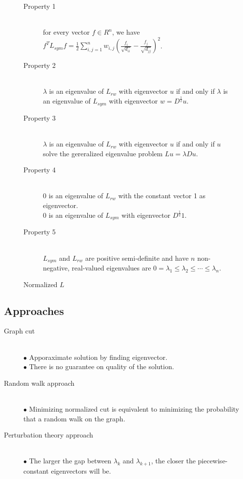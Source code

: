 \begin{figure}[ht]
\begin{mdframed}
\begin{description}
\item[Property 1] \hfill \\
for every vector $f \in R^n$, we have $f^T L_{sym} f = \frac{1}{2} \sum_{i,j=1}^{n} w_{i,j}(\frac{f_i}{\sqrt{d_{ii}}} - \frac{f_j}{\sqrt{d_{jj}}})^2$.
\item[Property 2] \hfill \\
$\lambda$ is an eigenvalue of $L_{rw}$ with eigenvector $u$ if and only if $\lambda$ is an eigenvalue of $L_{sym}$ with eigenvector $w = D^{\frac{1}{2}} u$.
\item[Property 3] \hfill \\
$\lambda$ is an eigenvalue of $L_{rw}$ with eigenvector $u$ if and only if $u$ solve the gereralized eigenvalue problem $L u = \lambda D u$.
\item[Property 4] \hfill \\
0 is an eigenvalue of $L_{rw}$ with the constant vector 1 as eigenvector.\\
0 is an eigenvalue of $L_{sym}$ with eigenvector $D^{\frac{1}{2}} 1 $.
\item[Property 5] \hfill \\
$L_{sym}$ and $L_{rw}$ are positive semi-definite and have $n$ non-negative, real-valued eigenvalues are $0 = \lambda_1 \leq  \lambda_2 \leq  \cdots \leq  \lambda_n$.
\end{description}
\end{mdframed}
\caption{Normalized $L$}
\end{figure}

\subsection{Approaches}
\begin{description}
\item[Graph cut] \hfill \\
$\bullet$ Apporaximate solution by finding eigenvector. \\
$\bullet$ There is no guarantee on quality of the solution.
\item[Random walk approach] \hfill \\
$\bullet$ Minimizing normalized cut is equivalent to minimizing the probability that a random walk on the graph.
\item[Perturbation theory approach] \hfill \\
$\bullet$ The larger the gap between $\lambda_{k}$ and $\lambda_{k+1}$, the closer the piecewise-constant eigenvectors will be.
\end{description}

